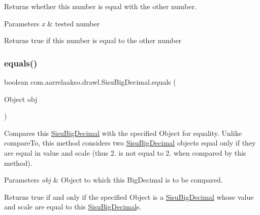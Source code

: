Returns whether this number is equal with the other number.


\begin{DoxyParams}{Parameters}
{\em x} & tested number \\
\hline
\end{DoxyParams}
\begin{DoxyReturn}{Returns}
true if this number is equal to the other number 
\end{DoxyReturn}
\mbox{\label{classcom_1_1aarrelaakso_1_1drawl_1_1_sisu_big_decimal_ade8b690f00af26d67a84b812ad694f20}} 
\subsubsection{\texorpdfstring{equals()}{equals()}\hspace{0.1cm}{\footnotesize\ttfamily [3/3]}}
{\footnotesize\ttfamily boolean com.\+aarrelaakso.\+drawl.\+Sisu\+Big\+Decimal.\+equals (\begin{DoxyParamCaption}\item[{Object}]{obj }\end{DoxyParamCaption})}

Compares this \hyperlink{classcom_1_1aarrelaakso_1_1drawl_1_1_sisu_big_decimal}{Sisu\+Big\+Decimal} with the specified Object for equality. Unlike compare\+To, this method considers two \hyperlink{classcom_1_1aarrelaakso_1_1drawl_1_1_sisu_big_decimal}{Sisu\+Big\+Decimal} objects equal only if they are equal in value and scale (thus 2. is not equal to 2. when compared by this method).


\begin{DoxyParams}{Parameters}
{\em obj} & Object to which this Big\+Decimal is to be compared. \\
\hline
\end{DoxyParams}
\begin{DoxyReturn}{Returns}
true if and only if the specified Object is a \hyperlink{classcom_1_1aarrelaakso_1_1drawl_1_1_sisu_big_decimal}{Sisu\+Big\+Decimal} whose value and scale are equal to this \hyperlink{classcom_1_1aarrelaakso_1_1drawl_1_1_sisu_big_decimal}{Sisu\+Big\+Decimal}\textquotesingle{}s. 
\end{DoxyReturn}
\mbox{\label{classcom_1_1aarrelaakso_1_1drawl_1_1_sisu_big_decimal_ad797c1167dea95aadaa653ee7f3cbf91}} 
